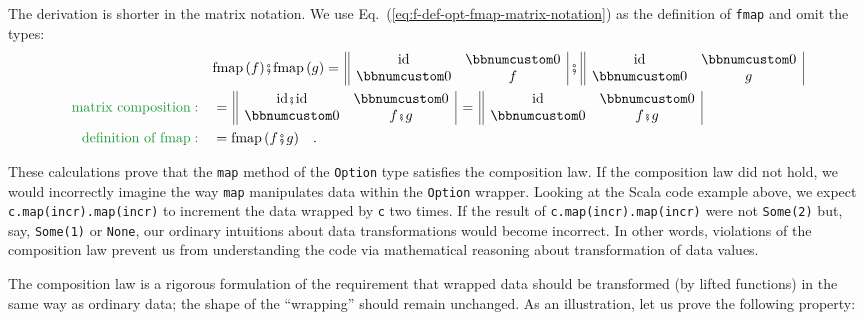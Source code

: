 The derivation is shorter in the matrix notation. We use Eq.~(\ref{eq:f-def-opt-fmap-matrix-notation})
as the definition of \lstinline!fmap! and omit the types:\vspace{-0.45\baselineskip}
\begin{align*}
 & \text{fmap}\,(f)\bef\text{fmap}\,(g)=\,\begin{array}{||cc|}
\text{id} & \bbnum 0\\
\bbnum 0 & f
\end{array}\,\bef\,\begin{array}{||cc|}
\text{id} & \bbnum 0\\
\bbnum 0 & g
\end{array}\\
{\color{greenunder}\text{matrix composition}:}\quad & =\,\begin{array}{||cc|}
\text{id}\bef\text{id} & \bbnum 0\\
\bbnum 0 & f\bef g
\end{array}\,=\,\begin{array}{||cc|}
\text{id} & \bbnum 0\\
\bbnum 0 & f\bef g
\end{array}\\
{\color{greenunder}\text{definition of fmap}:}\quad & =\text{fmap}\,(f\bef g)\quad.
\end{align*}
\vspace{-1.4\baselineskip}

\noindent These calculations prove that the \lstinline!map! method
of the \lstinline!Option! type satisfies the composition law. If
the composition law did not hold, we would incorrectly imagine the
way \lstinline!map! manipulates data within the \lstinline!Option!
wrapper. Looking at the Scala code example above, we expect \lstinline!c.map(incr).map(incr)!
to increment the data wrapped by \lstinline!c! two times. If the
result of \lstinline!c.map(incr).map(incr)! were not \lstinline!Some(2)!
but, say, \lstinline!Some(1)! or \lstinline!None!, our ordinary
intuitions about data transformations would become incorrect. In other
words, violations of the composition law prevent us from understanding
the code via mathematical reasoning about transformation of data values.

The composition law is a rigorous formulation of the requirement that
wrapped data should be transformed (by lifted functions) in the same
way as ordinary data; the shape of the \textsf{``}wrapping\textsf{''} should remain
unchanged. As an illustration, let us prove the following  property:

